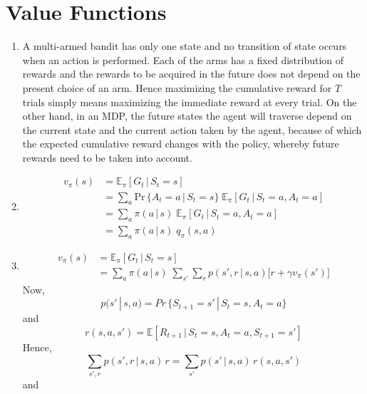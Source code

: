 \documentclass{article}
\begin{document}
\section{Value Functions}
\begin{enumerate}
	\item A multi-armed bandit has only one state and no transition of state occurs when an action is performed. Each of the arms has a fixed distribution of rewards and the rewards to be acquired in the future does not depend on the present choice of an arm. Hence maximizing the cumulative reward for $T$ trials simply means maximizing the immediate reward at every trial. On the other hand, in an MDP, the future states the agent will traverse depend on the current state and the current action taken by the agent, because of which the expected cumulative reward changes with the policy, whereby future rewards need to be taken into account.
	\item 
	\begin{equation*}
	\begin{split}
	v_\pi (s) &= \mathbb{E}_\pi[G_t\, |\, S_t = s]\\
	&= \sum_a\text{Pr}\,\{A_t = a \,|\, S_t = s\}\;\mathbb{E}_\pi[G_t\, |\, S_t = a, A_t = a]\\
	&= \sum_a\pi (a \,|\, s)\;\mathbb{E}_\pi[G_t\, |\, S_t = a, A_t = a]\\
	&= \sum_a\pi (a \,|\, s)\;q_\pi(s, a)
	\end{split}
	\end{equation*}
	\item 
	\begin{equation*}
	\begin{split}
	v_\pi (s) &= \mathbb{E}_\pi[G_t\, |\, S_t = s]\\
	&= \sum_a\pi (a \,|\, s)\;\sum_{s'}\sum_r p(s',r\,|\,s,a)\big[r + \gamma v_\pi(s')\big]
	\end{split}
	\end{equation*}
	Now, 
	\begin{equation*}
	p(s'\,|\, s,a) = Pr\,\{S_{t+1}=s'\,|\, S_t=s,A_t=a\}
	\end{equation*}
	and
	\begin{equation*}
	r(s,a,s') = \mathbb{E}[R_{t+1}\, | \, S_t = s, A_t=a, S_{t+1}=s']
	\end{equation*}
	Hence,
	\begin{equation*}
	\sum_{s',r}p(s',r\,|\,s,a)\,r = \sum_{s'}p(s'\,|\,s,a)\,r(s,a,s')
	\end{equation*}
	and
	\begin{equation*}

\end{equation*}
\end{enumerate}
\end{document}
